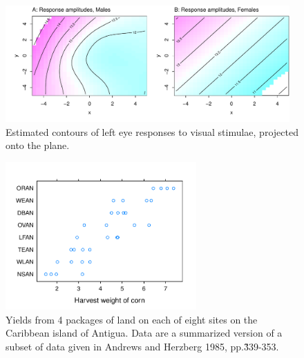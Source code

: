 \documentclass[12pt, a4paper,  BCOR=8.25mm, DIV=15]{scrartcl}\usepackage[]{graphicx}\usepackage[]{color}
\newenvironment{knitrout}{}{} %
\begin{document}
\begin{figure}
\begin{knitrout}
\color{fgcolor}

{\centering \includegraphics[width=0.97\textwidth]{figs/xmeth-plotVIS-12_2-1} 

}



\end{knitrout}
\caption{Estimated contours of left eye responses to visual stimulae,
projected onto the plane.\label{fig:visAmp}}
\end{figure}

\begin{figure}
\begin{knitrout}
\color{fgcolor}

{\centering \includegraphics[width=0.65\textwidth]{figs/xmeth-ant111b-12_3-1} 

}



\end{knitrout}
\caption{Yields from 4 packages of land on each of eight sites on the
  Caribbean island of Antigua. Data are a summarized version of a
  subset of data given in Andrews and Herzberg 1985,
  pp.\~339-353.\label{fig:caribbean}}
\end{figure}
\end{document}
